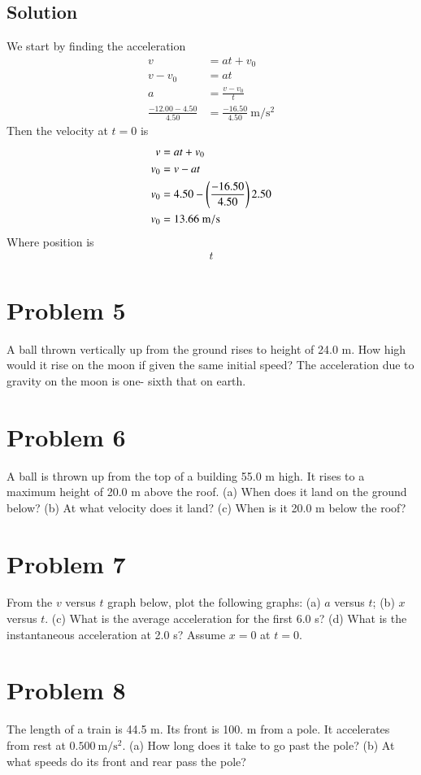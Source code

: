 \documentclass{article}
\begin{document}
\subsection*{Solution}
We start by finding the acceleration
\begin{align*}
	v &= at + v_0 \\
	v - v_0 &= at \\
	a &= \frac{v - v_0}{t} \\
	\frac{-12.00 - 4.50}{4.50} &= \frac{-16.50}{4.50}\ \unit{\meter\per\second^2}
\end{align*}
Then the velocity at $t=0$ is
\begin{align*}
	v &= at + v_0 \\
	v_0 &= v - at \\
	v_0 &= 4.50 - \left(\frac{-16.50}{4.50}\right) 2.50 \\
	v_0 &= 13.66\ \unit{{\meter\per\second}}
\end{align*}
Where position is
\begin{align*}
	t
\end{align*}

\section*{Problem 5}
A ball thrown vertically up from the ground rises to height of 24.0 m. How high would it rise
on the moon if given the same initial speed? The acceleration due to gravity on the moon is one-
sixth that on earth.

\section*{Problem 6}
A ball is thrown up from the top of a building 55.0 m high. It rises to a maximum height
of 20.0 m above the roof. (a) When does it land on the ground below? (b) At what velocity
does it land? (c) When is it 20.0 m below the roof?

\section*{Problem 7}
From the $v$ versus $t$ graph below, plot the following graphs: (a) $a$ versus $t$; (b) $x$ versus $t$.
(c) What is the average acceleration for the first 6.0 s? (d) What is the instantaneous
acceleration at 2.0 s? Assume $x = 0$ at $t = 0$.

\section*{Problem 8}
The length of a train is 44.5 m. Its front is 100. m from a pole. It accelerates from rest at
$0.500\ \unit{\meter\per\second^2}$. (a) How long does it take to go past the pole? (b) At what speeds do its front and
rear pass the pole?
\end{document}
